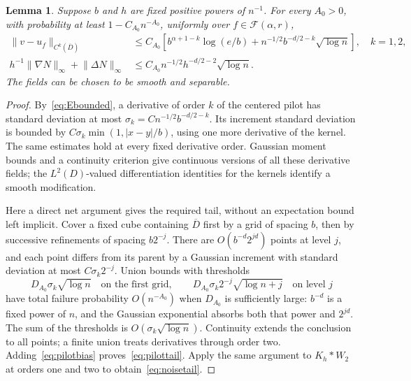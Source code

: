 \documentclass[11pt]{article}
\newtheorem{lemma}[theorem]{Lemma}
\theoremstyle{remark}
\newcommand{\cF}{\mathcal F}
\newcommand{\norm}[1]{\lVert #1\rVert}
\newcommand{\abs}[1]{\lvert #1\rvert}
\begin{document}
\begin{lemma}\label{lem:pilot}
Suppose $b$ and $h$ are fixed positive powers of $n^{-1}$. For every $A_0>0$, with probability at least $1-C_{A_0}n^{-A_0}$, uniformly over $f\in\cF(\alpha,r)$,
\begin{align}
 \norm{v-u_f}_{C^k(\overline D)}
 &\le C_{A_0}\left[b^{\alpha+1-k}\log(e/b)
       +n^{-1/2}b^{-d/2-k}\sqrt{\log n}\right],\quad k=1,2,
 \label{eq:pilottail}\\
 h^{-1}\norm{\nabla N}_\infty+\norm{\Delta N}_\infty
 &\le C_{A_0}n^{-1/2}h^{-d/2-2}\sqrt{\log n}.
 \label{eq:noisetail}
\end{align}
The fields can be chosen to be smooth and separable.
\end{lemma}
\begin{proof}
By~\eqref{eq:Ebounded}, a derivative of order $k$ of the centered pilot has standard deviation at most
$\sigma_k=Cn^{-1/2}b^{-d/2-k}$.
Its increment standard deviation is bounded by
$C\sigma_k\min(1,\abs{x-y}/b)$, using one more derivative of the kernel. The same estimates hold at every fixed derivative order. Gaussian moment bounds and a continuity criterion give continuous versions of all these derivative fields; the $L^2(D)$-valued differentiation identities for the kernels identify a smooth modification.

Here a direct net argument gives the required tail, without an expectation bound left implicit. Cover a fixed cube containing $\overline D$ first by a grid of spacing $b$, then by successive refinements of spacing $b2^{-j}$. There are $O(b^{-d}2^{jd})$ points at level $j$, and each point differs from its parent by a Gaussian increment with standard deviation at most $C\sigma_k2^{-j}$. Union bounds with thresholds
\[
 D_{A_0}\sigma_k\sqrt{\log n}\quad\text{on the first grid},\qquad
 D_{A_0}\sigma_k2^{-j}\sqrt{\log n+j}\quad\text{on level }j
\]
have total failure probability $O(n^{-A_0})$ when $D_{A_0}$ is sufficiently large: $b^{-d}$ is a fixed power of $n$, and the Gaussian exponential absorbs both that power and $2^{jd}$. The sum of the thresholds is $O(\sigma_k\sqrt{\log n})$. Continuity extends the conclusion to all points; a finite union treats derivatives through order two. Adding~\eqref{eq:pilotbias} proves~\eqref{eq:pilottail}. Apply the same argument to $K_h*W_2$ at orders one and two to obtain~\eqref{eq:noisetail}.
\end{proof}
\end{document}
